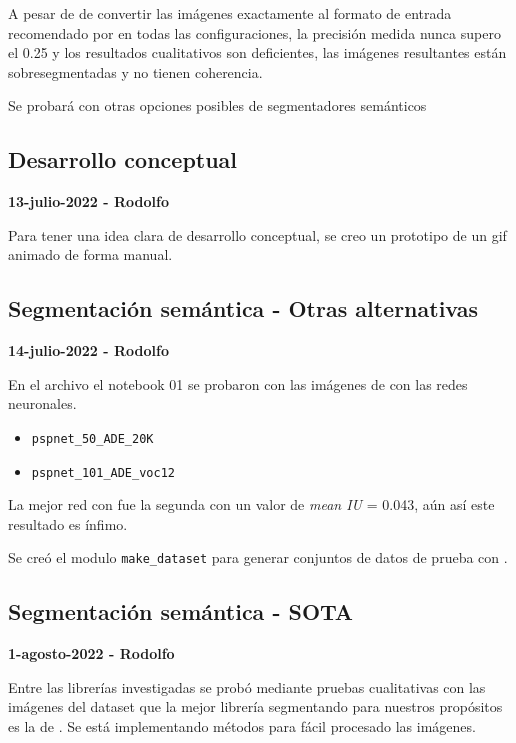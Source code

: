 A pesar de de convertir las imágenes exactamente al formato de entrada recomendado por \textcite{gupta2022} en todas las configuraciones, la precisión medida nunca supero el 0.25 y los resultados cualitativos son  deficientes, las imágenes resultantes están sobresegmentadas y no tienen coherencia.

Se probará con otras opciones posibles de segmentadores semánticos


\subsection*{Desarrollo conceptual}

\textbf{13-julio-2022 - Rodolfo}

Para tener una idea clara de desarrollo conceptual, se creo un prototipo de un gif animado de forma manual.

\subsection*{Segmentación semántica - Otras alternativas}

\textbf{14-julio-2022 - Rodolfo}

En el archivo el notebook 01 se probaron con las imágenes de \textcite{unity2022} con las redes neuronales.

\begin{itemize}
    \item \texttt{pspnet\_50\_ADE\_20K}
    \item \texttt{pspnet\_101\_ADE\_voc12}
\end{itemize}

La mejor red con fue la segunda con un valor de \textit{mean IU} = 0.043, aún así este resultado es ínfimo.


Se creó el modulo  \texttt{make\_dataset} para generar conjuntos de datos de prueba con \textcite{unity2022}.


\subsection*{Segmentación semántica - SOTA}

\textbf{1-agosto-2022 - Rodolfo}

Entre las librerías investigadas se probó mediante pruebas cualitativas con las imágenes del dataset que la mejor librería segmentando para nuestros propósitos es la de \textcite{aung2022}. Se está implementando métodos para fácil procesado las imágenes. 

